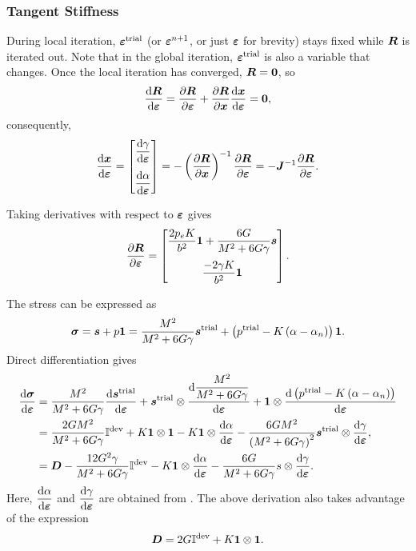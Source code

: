 \subsubsection{Tangent Stiffness}
During local iteration, $\bm{\varepsilon}^\text{trial}$ (or $\bm{\varepsilon}^{n+1}$, or just $\bm{\varepsilon}$ for brevity) stays fixed while $\bm{R}$ is iterated out.
Note that in the global iteration, $\bm{\varepsilon}^\text{trial}$ is also a variable that changes.
Once the local iteration has converged, $\bm{R}=\bm{0}$, so
\begin{gather}
\dfrac{\mathrm{d}\bm{R}}{\mathrm{d}\bm{\varepsilon}}=\dfrac{\partial{\bm{R}}}{\partial{\bm{\varepsilon}}}+\dfrac{\partial{\bm{R}}}{\partial{\bm{x}}}\dfrac{\mathrm{d}\bm{x}}{\mathrm{d}\bm{\varepsilon}}=\bm{0},
\end{gather}
consequently,
\begin{gather}\label{eq:mcc_tangent}
\dfrac{\mathrm{d}\bm{x}}{\mathrm{d}\bm{\varepsilon}}=
\begin{bmatrix}
\dfrac{\mathrm{d}\gamma}{\mathrm{d}\bm{\varepsilon}}\\[4mm]\dfrac{\mathrm{d}\alpha}{\mathrm{d}\bm{\varepsilon}}
\end{bmatrix}
=-\left(\dfrac{\partial{\bm{R}}}{\partial{\bm{x}}}\right)^{-1}\dfrac{\partial{\bm{R}}}{\partial{\bm{\varepsilon}}}=-\bm{J}^{-1}\dfrac{\partial{\bm{R}}}{\partial{\bm{\varepsilon}}}.
\end{gather}

Taking derivatives with respect to $\bm{\varepsilon}$ gives
\begin{gather}
\dfrac{\partial{\bm{R}}}{\partial{\bm{\varepsilon}}}=\begin{bmatrix}
\dfrac{2p_eK}{b^2}\bm{1}+\dfrac{6G}{M^2+6G\gamma}\bm{s}\\[4mm]
\dfrac{-2\gamma{}K}{b^2}\bm{1}
\end{bmatrix}.
\end{gather}

The stress can be expressed as
\begin{gather}
\bm{\sigma}=\bm{s}+p\bm{1}=\dfrac{M^2}{M^2+6G\gamma}\bm{s}^\text{trial}+\left(p^\text{trial}-K\left(\alpha-\alpha_n\right)\right)\bm{1}.
\end{gather}
Direct differentiation gives
\begin{gather}
\begin{split}
\dfrac{\mathrm{d}\bm{\sigma}}{\mathrm{d}\bm{\varepsilon}}&=\dfrac{M^2}{M^2+6G\gamma}\dfrac{\mathrm{d}\bm{s}^\text{trial}}{\mathrm{d}\bm{\varepsilon}}+\bm{s}^\text{trial}\otimes\dfrac{\mathrm{d}\dfrac{M^2}{M^2+6G\gamma}}{\mathrm{d}\bm{\varepsilon}}+\bm{1}\otimes\dfrac{\mathrm{d}\left(p^\text{trial}-K\left(\alpha-\alpha_n\right)\right)}{\mathrm{d}\bm{\varepsilon}}\\
&=\dfrac{2GM^2}{M^2+6G\gamma}\mathbb{I}^\text{dev}+K\bm{1}\otimes{}\bm{1}-K\bm{1}\otimes\dfrac{\mathrm{d}\alpha}{\mathrm{d}\bm{\varepsilon}}-\dfrac{6GM^2}{\left(M^2+6G\gamma\right)^2}\bm{s}^\text{trial}\otimes\dfrac{\mathrm{d}\gamma}{\mathrm{d}\bm{\varepsilon}},\\
&=\bm{D}-\dfrac{12G^2\gamma}{M^2+6G\gamma}\mathbb{I}^\text{dev}-K\bm{1}\otimes\dfrac{\mathrm{d}\alpha}{\mathrm{d}\bm{\varepsilon}}-\dfrac{6G}{M^2+6G\gamma}s\otimes\dfrac{\mathrm{d}\gamma}{\mathrm{d}\bm{\varepsilon}}.
\end{split}
\end{gather}
Here, $\dfrac{\mathrm{d}\alpha}{\mathrm{d}\bm{\varepsilon}}$ and $\dfrac{\mathrm{d}\gamma}{\mathrm{d}\bm{\varepsilon}}$ are obtained from .
The above derivation also takes advantage of the expression
\begin{gather}
\bm{D}=2G\mathbb{I}^\text{dev}+K\bm{1}\otimes{}\bm{1}.
\end{gather}
